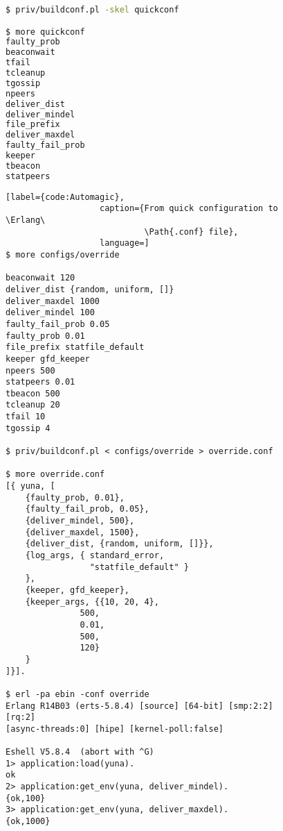 \begin{figure}[hbt]
\begin{lstlisting}[label={code:Skeleton},
                   caption={Generating a quick configuration skeleton},
                   language=bash]
$ priv/buildconf.pl -skel quickconf

$ more quickconf
faulty_prob 
beaconwait 
tfail 
tcleanup 
tgossip 
npeers 
deliver_dist 
deliver_mindel 
file_prefix 
deliver_maxdel 
faulty_fail_prob 
keeper 
tbeacon 
statpeers 

\end{lstlisting}
\end{figure}

\begin{figure}[hbt]
\begin{lstlisting}[label={code:Automagic},
                   caption={From quick configuration to \Erlang\
                            \Path{.conf} file},
                   language=]
$ more configs/override

beaconwait 120
deliver_dist {random, uniform, []}
deliver_maxdel 1000
deliver_mindel 100
faulty_fail_prob 0.05
faulty_prob 0.01
file_prefix statfile_default
keeper gfd_keeper
npeers 500
statpeers 0.01
tbeacon 500
tcleanup 20
tfail 10
tgossip 4

$ priv/buildconf.pl < configs/override > override.conf

$ more override.conf
[{ yuna, [
	{faulty_prob, 0.01},
	{faulty_fail_prob, 0.05},
    {deliver_mindel, 500},
	{deliver_maxdel, 1500},
	{deliver_dist, {random, uniform, []}},
	{log_args, { standard_error,
	             "statfile_default" }
	},
	{keeper, gfd_keeper},
	{keeper_args, {{10, 20, 4},
		       500,
		       0.01,
		       500,
		       120}
	}
]}].

$ erl -pa ebin -conf override
Erlang R14B03 (erts-5.8.4) [source] [64-bit] [smp:2:2] [rq:2]
[async-threads:0] [hipe] [kernel-poll:false]

Eshell V5.8.4  (abort with ^G)
1> application:load(yuna).
ok
2> application:get_env(yuna, deliver_mindel).
{ok,100}
3> application:get_env(yuna, deliver_maxdel).
{ok,1000}
\end{lstlisting}
\end{figure}

